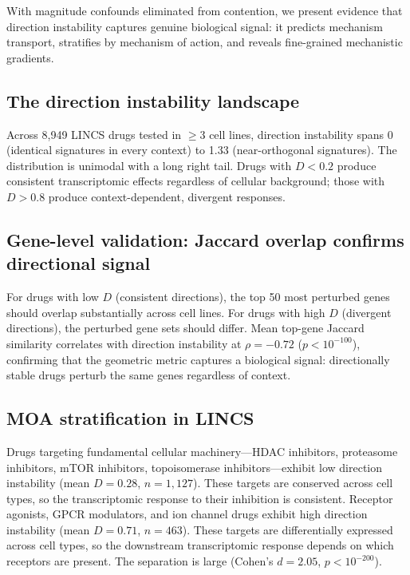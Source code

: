 \documentclass[11pt]{article}
\begin{document}
With magnitude confounds eliminated from contention, we present evidence
that direction instability captures genuine biological signal: it
predicts mechanism transport, stratifies by mechanism of action, and
reveals fine-grained mechanistic gradients.

\subsection{The direction instability landscape}

Across 8{,}949 LINCS drugs tested in $\geq 3$ cell lines, direction
instability spans 0 (identical signatures in every context) to 1.33
(near-orthogonal signatures). The distribution is unimodal with a long
right tail. Drugs with $D < 0.2$ produce consistent transcriptomic
effects regardless of cellular background; those with $D > 0.8$ produce
context-dependent, divergent responses.

\subsection{Gene-level validation: Jaccard overlap confirms directional signal}

For drugs with low $D$ (consistent directions), the top 50 most
perturbed genes should overlap substantially across cell lines. For
drugs with high $D$ (divergent directions), the perturbed gene sets
should differ. Mean top-gene Jaccard similarity correlates with direction
instability at $\rho = -0.72$ ($p < 10^{-100}$), confirming that the
geometric metric captures a biological signal: directionally stable drugs
perturb the same genes regardless of context.

\subsection{MOA stratification in LINCS}

Drugs targeting fundamental cellular machinery---HDAC inhibitors,
proteasome inhibitors, mTOR inhibitors, topoisomerase
inhibitors---exhibit low direction instability (mean $D = 0.28$, $n =
1{,}127$). These targets are conserved across cell types, so the
transcriptomic response to their inhibition is consistent. Receptor
agonists, GPCR modulators, and ion channel drugs exhibit high direction
instability (mean $D = 0.71$, $n = 463$). These targets are
differentially expressed across cell types, so the downstream
transcriptomic response depends on which receptors are present.
The separation is large (Cohen's $d = 2.05$, $p < 10^{-200}$).
\end{document}
